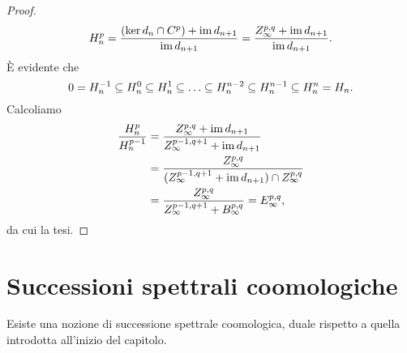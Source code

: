 \begin{proof}
$$
H^p_n=\frac{(\ker d_n\cap C^p)+\operatorname{im} d_{n+1}}{\operatorname{im} d_{n+1}}=\frac{Z^{p,q}_\infty+\operatorname{im} d_{n+1}}{\operatorname{im} d_{n+1}}.
$$
È evidente che
$$
0=H^{-1}_n\subseteq H^0_n\subseteq H^1_n\subseteq\ldots\subseteq H^{n-2}_n\subseteq H^{n-1}_n\subseteq H^n_n=H_n.
$$
Calcoliamo
\begin{align*}
\frac{H^p_n}{H^{p-1}_n}&=\frac{Z^{p,q}_\infty+\operatorname{im} d_{n+1}}{Z^{p-1,q+1}_\infty+\operatorname{im} d_{n+1}}\\
&=\frac{Z^{p,q}_\infty}{(Z^{p-1,q+1}_\infty+\operatorname{im} d_{n+1})\cap Z^{p,q}_\infty}\\
&=\frac{Z^{p,q}_\infty}{Z^{p-1,q+1}_\infty+B^{p,q}_\infty}=E^{p,q}_\infty,
\end{align*}
da cui la tesi.
\end{proof}

\section{Successioni spettrali coomologiche}

Esiste una nozione di successione spettrale coomologica, duale rispetto a quella introdotta all'inizio del capitolo.

